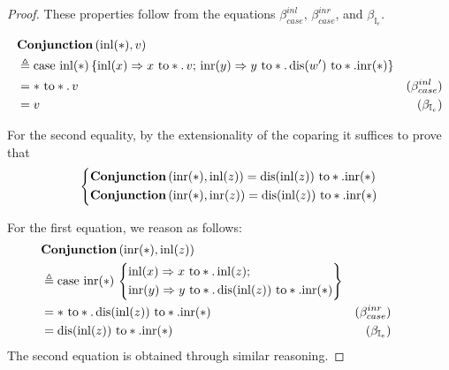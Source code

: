   \begin{proof}
    These properties follow from the equations $\beta_{case}^{inl}$, $\beta_{case}^{inr}$, and $\beta_{\mathbb{I}_{e}}$.

    \begin{equation*}
    \begin{split}
      & \textbf{Conjunction} \, (\mathrm{inl}(*),v) \\
      & \triangleq  \text{case } \mathrm{inl}(*)\,
  \{\mathrm{inl}(x) \Rightarrow x \text{ to} *. \, v ;
  \, \mathrm{inr}(y) \Rightarrow y \text{ to} *. \,  \text{dis}(w') \text{ to} *. \mathrm{inr}(*)
  \} \\
  & = * \text{ to} *. \,v & (\beta_{case}^{inl}) \\
  & = v & (\beta_{\mathbb{I}_{e}}) 
    \end{split}
    \end{equation*}

    For the second equality, by the extensionality of the coparing it suffices to prove that 
     \[
      \left\{
      \begin{aligned}
      &   \textbf{Conjunction} \, (\mathrm{inr}(*), \mathrm{inl}(z)) = \text{dis}(\mathrm{inl}(z)) \text{ to} *. \mathrm{inr}(*) \\
      & \textbf{Conjunction} \, (\mathrm{inr}(*), \mathrm{inr}(z)) = \text{dis}(\mathrm{inl}(z)) \text{ to} *. \mathrm{inr}(*)
      \end{aligned}
      \right.
      \]

    For the first equation, we reason as follows:
    \begin{align*}
      & \hspace{-22pt} \textbf{Conjunction} \, (\inr(*), \inl(z)) \\
      & \hspace{-22pt}  \triangleq  \text{case } \inr(*)\,   \left\{\begin{aligned} 
 &\inl(x) \Rightarrow x \text{ to} *. \,  \inl(z) ; \\
  &\inr(y) \Rightarrow y \text{ to} *. \,  \text{dis}(\inl(z)) \text{ to} *. \inr(*) \end{aligned} 
  \right\} \\
  & \hspace{-22pt}  =  *  \text{ to} *. \,  \text{dis}(\inl(z)) \text{ to} *. \inr(*) & (\beta_{case}^{inr}) \\
  & \hspace{-22pt}  =   \text{dis}(\inl(z)) \text{ to} *. \inr(*) & (\beta_{\mathbb{I}_{e}}) \\
    \end{align*}
      The second equation is obtained through similar reasoning.
  \end{proof}


